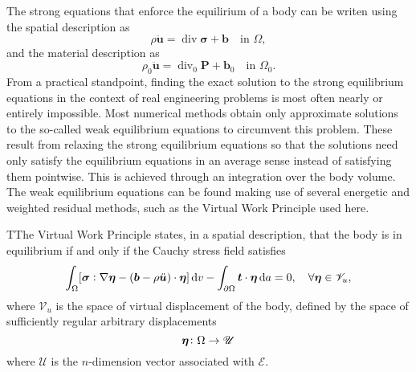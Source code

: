 The strong equations that enforce the equilirium of a body can be writen using the spatial description as
\begin{equation}
  \rho \ddot{\bm u} = \operatorname{div}\bm \sigma + \bm b\quad \text{in $\Omega$},
\end{equation}
and the material description as
\begin{equation}
  \rho_0\ddot{\bm u} = \operatorname{div}_0 \bm P + \bm b_0\quad \text{in $\Omega_0$}.
\end{equation}
From a practical standpoint, finding the exact solution to the strong equilibrium equations in the context of real engineering problems is most often nearly or entirely impossible.
Most numerical methods obtain only approximate solutions to the so-called weak equilibrium equations to circumvent this problem.
These result from relaxing the strong equilibrium equations so that the solutions need only satisfy the equilibrium equations in an average sense instead of satisfying them pointwise.
This is achieved through an integration over the body volume.
The weak equilibrium equations can be found making use of several energetic and weighted residual methods, such as the Virtual Work Principle used here.
\enlargethispage{\baselineskip}
\begin{problem}
TThe Virtual Work Principle states, in a spatial description, that the body is in equilibrium if and only if the Cauchy stress field satisfies
    \begin{equation}
        \int_\Omega [\bm{\sigma}:\nabla \bm{\eta} - (\bm{b} -\rho \ddot{\bm u})\cdot \bm{\eta}]\,\mathrm{d} v - \int_{\partial\Omega} \bm{t}\cdot \bm{\eta}\,\mathrm{d} a = 0,\quad \forall \bm{\eta} \in \mathscr{V}_u,
    \end{equation}
 where $\mathscr{V}_u$ is the space of virtual displacement of the body, defined by the space of sufficiently regular arbitrary displacements
 \begin{equation}
     \bm{\eta}\colon \Omega\to  \mathscr{U}
 \end{equation}
 where $\mathscr{U}$ is the $n$-dimension vector associated with $\mathscr{E}$.
 \end{problem}



